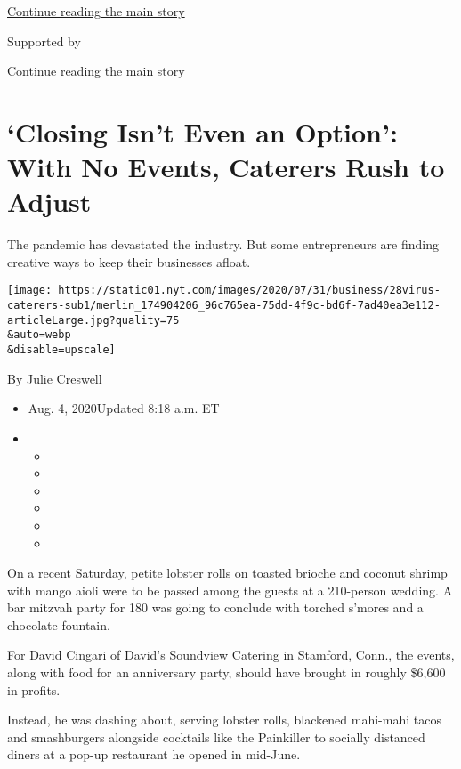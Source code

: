 \protect\hyperlink{after-top}{Continue reading the main story}

Supported by

\protect\hyperlink{after-sponsor}{Continue reading the main story}

\hypertarget{closing-isnt-even-an-option-with-no-events-caterers-rush-to-adjust}{%
\section{`Closing Isn't Even an Option': With No Events, Caterers Rush
to
Adjust}\label{closing-isnt-even-an-option-with-no-events-caterers-rush-to-adjust}}

The pandemic has devastated the industry. But some entrepreneurs are
finding creative ways to keep their businesses afloat.

\texttt{[image: https://static01.nyt.com/images/2020/07/31/business/28virus-caterers-sub1/merlin\_174904206\_96c765ea-75dd-4f9c-bd6f-7ad40ea3e112-articleLarge.jpg?quality=75\\\&auto=webp\\\&disable=upscale]}

By \href{https://www.nytimes.com/by/julie-creswell}{Julie Creswell}

\begin{itemize}
\item
  Aug. 4, 2020Updated 8:18 a.m. ET
\item
  \begin{itemize}
  \item
  \item
  \item
  \item
  \item
  \item
  \end{itemize}
\end{itemize}

On a recent Saturday, petite lobster rolls on toasted brioche and
coconut shrimp with mango aioli were to be passed among the guests at a
210-person wedding. A bar mitzvah party for 180 was going to conclude
with torched s'mores and a chocolate fountain.

For David Cingari of David's Soundview Catering in Stamford, Conn., the
events, along with food for an anniversary party, should have brought in
roughly \$6,600 in profits.

Instead, he was dashing about, serving lobster rolls, blackened
mahi-mahi tacos and smashburgers alongside cocktails like the Painkiller
to socially distanced diners at a pop-up restaurant he opened in
mid-June.

